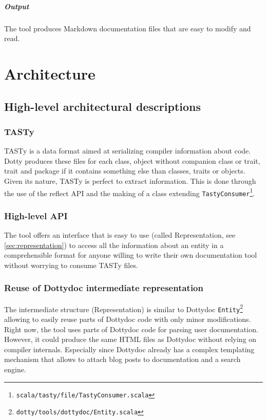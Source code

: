 \documentclass{report}
\begin{document}
\paragraph{Output}
The tool produces Markdown documentation files that are easy to modify and read.

\chapter{Architecture}
\section{High-level architectural descriptions}
\subsection{TASTy}
TASTy is a data format aimed at serializing compiler information about code. Dotty produces these files for each class, object without companion class or trait, trait and package if it contains something else than classes, traits or objects. Given its nature, TASTy is perfect to extract information.
This is done through the use of the reflect API and the making of a class extending \texttt{TastyConsumer}\footnote{\texttt{scala/tasty/file/TastyConsumer.scala}}.

\subsection{High-level API}
The tool offers an interface that is easy to use (called Representation, see \autoref{sec:representation}) to access all the information about an entity in a comprehensible format for anyone willing to write their own documentation tool without worrying to consume TASTy files.

\subsection{Reuse of Dottydoc intermediate representation}
The intermediate structure (Representation) is similar to Dottydoc \texttt{Entity}\footnote{\texttt{dotty/tools/dottydoc/Entity.scala}} allowing to easily reuse parts of Dottydoc code with only minor modifications. Right now, the tool uses parts of Dottydoc code for parsing user documentation. However, it could produce the same HTML files as Dottydoc without relying on compiler internals. Especially since Dottydoc already has a complex templating mechanism that allows to attach blog posts to documentation and a search engine.
\end{document}
